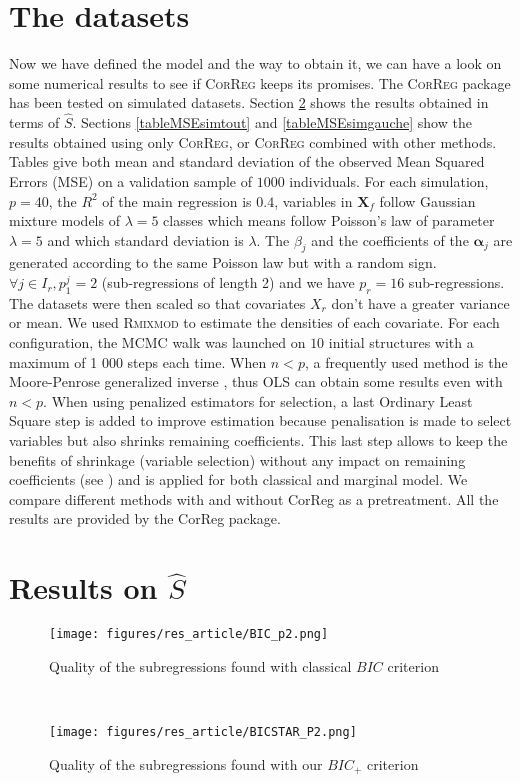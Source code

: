 \documentclass[12pt,a4paper]{report}
\begin{document}
	\section{The datasets}	
	Now we have defined the model and the way to obtain it, we can have a look on some numerical results to see if \textsc{CorReg} 	keeps its promises.
	The \textsc{CorReg} package has been tested on simulated datasets. 
Section \ref{compZ} shows the results obtained in terms of $\hat{S}$. Sections \ref{tableMSEsimtout} and \ref{tableMSEsimgauche} show the results obtained using only \textsc{CorReg}, or \textsc{CorReg} combined with other methods. Tables give both mean and standard deviation of the observed Mean Squared Errors (MSE) on a validation sample of $1 000$ individuals. For each simulation,  $p=40$, the $R^2$ of the main regression is $0.4$, variables in $\boldsymbol{X}_f$ follow Gaussian mixture models of $\lambda=5$ classes which means follow Poisson's law of parameter $\lambda=5$ and which standard deviation is $\lambda$. The $\beta_j$ and the coefficients of the $\boldsymbol{\alpha}_j$ are generated according to the same Poisson law but with a random sign. $\forall j \in I_r, p_1^j=2$ (sub-regressions of length 2) and we have $p_r=16$ sub-regressions. The datasets were then scaled so that covariates $X_r$ don't have a greater variance or mean.
	We used \textsc{Rmixmod} to estimate the densities of each covariate. For each configuration, the MCMC walk was launched on $10$ initial structures with a maximum of 1 000 steps each time.
	When $n<p$, a frequently used method is the Moore-Penrose generalized inverse \cite{katsikis2008fast}, thus OLS can obtain some results even with $n<p$. %
	When using penalized estimators for selection, a last Ordinary Least Square step is added to improve estimation because penalisation is made to select variables but also shrinks remaining coefficients. This last step allows to keep the benefits of shrinkage (variable selection) without any impact on remaining coefficients (see \cite{SAM10088}) and is applied for both classical and marginal model.
	We compare different methods with and without CorReg as a pretreatment. All the results are provided by the CorReg package.
	
		\section{Results on $\hat S$}	\label{compZ}


\begin{figure}[h!]
	\begin{minipage}[l]{.48\linewidth}
			\texttt{[image: figures/res\_article/BIC\_p2.png]} 
			\caption{Quality of the subregressions found with classical $BIC$ criterion}
	\end{minipage} \
   \begin{minipage}[r]{.48\linewidth}
			\texttt{[image: figures/res\_article/BICSTAR\_P2.png]} 
			\caption{Quality of the subregressions found with our $BIC_+$ criterion} 
   \end{minipage}
\end{figure}
\end{document}
